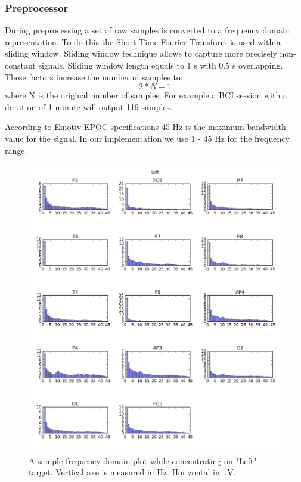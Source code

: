 \documentclass[12pt]{article}
\begin{document}
\subsubsection{Preprocessor}

During preprocessing a set of raw samples is converted to a frequency domain representation. To do this the Short Time Fourier Transform is used with a sliding window. Sliding window technique allows to capture more precisely non-constant signals. Sliding window length equals to 1 s with 0.5 s overlapping. These factors increase the number of samples to:\[2*N-1\] where N is the original number of samples. For example a BCI session with a duration of 1 minute will output 119 samples.

According to Emotiv EPOC specifications\cite{emotiv} 45 Hz is the maximum bandwidth value for the signal. In our implementation we use 1 - 45 Hz for the frequency range.

\begin{figure} [H]
\begin{center}
\includegraphics[width=1\textwidth]{left_amplitudes}
\caption{A sample frequency domain plot while concentrating on "Left" target. Vertical axe is measured in Hz. Horizontal in uV.}
\end{center}
\end{figure}
\end{document}
